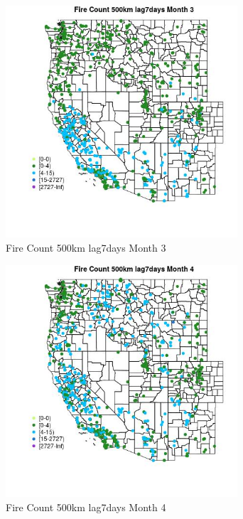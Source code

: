 \begin{figure} 
\centering  
\includegraphics[width=0.77\textwidth]{Code_Outputs/Report_ML_input_PM25_Step4_part_f_de_duplicated_aves_prioritize_24hr_obswNAs_MapObsMo3Fire_Count_500km_lag7days.jpg} 
\caption{\label{fig:Report_ML_input_PM25_Step4_part_f_de_duplicated_aves_prioritize_24hr_obswNAsMapObsMo3Fire_Count_500km_lag7days}Fire Count 500km lag7days Month 3} 
\end{figure} 
 

\begin{figure} 
\centering  
\includegraphics[width=0.77\textwidth]{Code_Outputs/Report_ML_input_PM25_Step4_part_f_de_duplicated_aves_prioritize_24hr_obswNAs_MapObsMo4Fire_Count_500km_lag7days.jpg} 
\caption{\label{fig:Report_ML_input_PM25_Step4_part_f_de_duplicated_aves_prioritize_24hr_obswNAsMapObsMo4Fire_Count_500km_lag7days}Fire Count 500km lag7days Month 4} 
\end{figure} 
 

